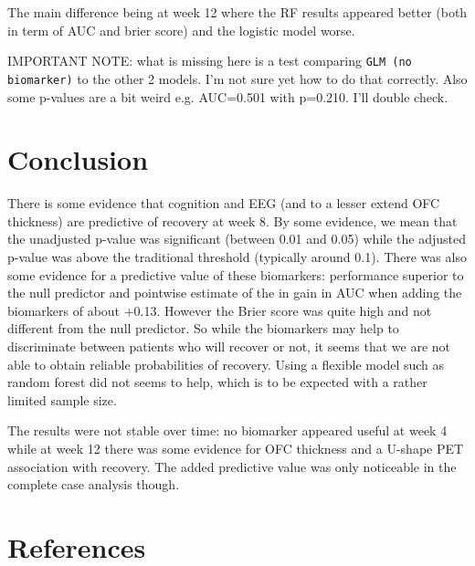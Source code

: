 \documentclass[12pt]{article}
\begin{document}
The main difference being at week 12 where the RF results appeared
better (both in term of AUC and brier score) and the logistic model
worse.

\bigskip

IMPORTANT NOTE: what is missing here is a test comparing \texttt{GLM (no
biomarker)} to the other 2 models. I'm not sure yet how to do that
correctly. \newline Also some p-values are a bit weird e.g. AUC=0.501
with p=0.210. I'll double check.

\clearpage

\section{Conclusion}
\label{sec:orgee8ca91}

There is some evidence that cognition and EEG (and to a lesser extend
OFC thickness) are predictive of recovery at week 8. By some evidence,
we mean that the unadjusted p-value was significant (between 0.01 and
0.05) while the adjusted p-value was above the traditional threshold
(typically around 0.1). There was also some evidence for a predictive
value of these biomarkers: performance superior to the null predictor
and pointwise estimate of the in gain in AUC when adding the
biomarkers of about +0.13. However the Brier score was quite high and
not different from the null predictor. So while the biomarkers may
help to discriminate between patients who will recover or not, it
seems that we are not able to obtain reliable probabilities of
recovery. \newline Using a flexible model such as random forest did
not seems to help, which is to be expected with a rather limited
sample size.

\bigskip

The results were not stable over time: no biomarker appeared useful at
week 4 while at week 12 there was some evidence for OFC thickness and
a U-shape PET association with recovery. The added predictive value
was only noticeable in the complete case analysis though.

\section{References}
\label{sec:org294b126}
\begingroup
\renewcommand{\section}[2]{}


\end{document}
